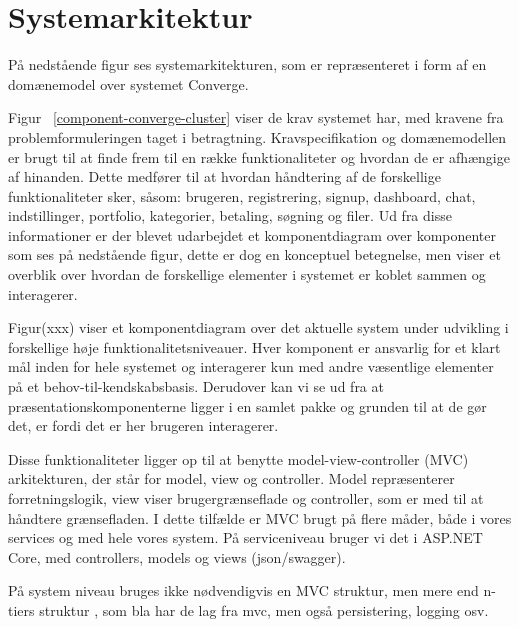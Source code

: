 
\section{Systemarkitektur}
På nedstående figur ses systemarkitekturen, som er repræsenteret i form af en domænemodel over systemet Converge.


Figur ~\ref{component-converge-cluster} viser de krav systemet har, med kravene fra problemformuleringen taget i betragtning. Kravspecifikation og domænemodellen er brugt til at finde frem til en række funktionaliteter og hvordan de er afhængige af hinanden. Dette medfører til at hvordan håndtering af de forskellige funktionaliteter sker, såsom: brugeren, registrering, signup, dashboard, chat, indstillinger, portfolio, kategorier, betaling, søgning og filer. Ud fra disse informationer er der blevet udarbejdet et komponentdiagram over komponenter som ses på nedstående figur, dette er dog en konceptuel betegnelse, men viser et overblik over hvordan de forskellige elementer i systemet er koblet sammen og interagerer.


Figur(xxx) viser et komponentdiagram over det aktuelle system under udvikling i forskellige høje funktionalitetsniveauer. Hver komponent er ansvarlig for et klart mål inden for hele systemet og interagerer kun med andre væsentlige elementer på et behov-til-kendskabsbasis. Derudover kan vi se ud fra at præsentationskomponenterne ligger i en samlet pakke og grunden til at de gør det, er fordi det er her brugeren interagerer.

Disse funktionaliteter ligger op til at benytte model-view-controller (MVC) \cite[MVC]{converge-terms} arkitekturen, der står for model, view og controller. Model repræsenterer forretningslogik, view viser brugergrænseflade og controller, som er med til at håndtere grænsefladen. I dette tilfælde er MVC brugt på flere måder, både i vores services og med hele vores system. På serviceniveau bruger vi det i ASP.NET Core, med controllers, models og views (json/swagger). 

På system niveau bruges ikke nødvendigvis en MVC struktur, men mere end n-tiers struktur \cite[n-tiers struktur]{converge-terms}, som bla har de lag fra mvc, men også persistering, logging osv.




